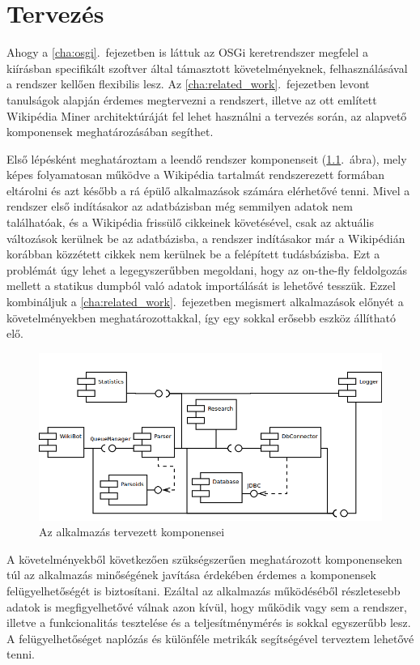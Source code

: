 \chapter{Tervezés}
\label{cha:design}

Ahogy a \ref{cha:osgi}.~fejezetben is láttuk az OSGi keretrendszer megfelel a kiírásban specifikált szoftver által támasztott követelményeknek, felhasználásával a rendszer kellően flexibilis lesz. Az \ref{cha:related_work}.~fejezetben levont tanulságok alapján érdemes megtervezni a rendszert, illetve az ott említett Wikipédia Miner architektúráját fel lehet használni a tervezés során, az alapvető komponensek meghatározásában segíthet.

Első lépésként meghatároztam a leendő rendszer komponenseit (\ref{fig:componentdiagram}.~ábra), mely képes folyamatosan működve a Wikipédia tartalmát rendszerezett formában eltárolni és azt később a rá épülő alkalmazások számára elérhetővé tenni. Mivel a rendszer első indításakor az adatbázisban még semmilyen adatok nem találhatóak, és a Wikipédia frissülő cikkeinek követésével, csak az aktuális változások kerülnek be az adatbázisba, a rendszer indításakor már a Wikipédián korábban közzétett cikkek nem kerülnek be a felépített tudásbázisba. Ezt a problémát úgy lehet a legegyszerűbben megoldani, hogy az on-the-fly feldolgozás mellett a statikus dumpból való adatok importálását is lehetővé tesszük. Ezzel kombináljuk a \ref{cha:related_work}.~fejezetben megismert alkalmazások előnyét a követelményekben meghatározottakkal, így egy sokkal erősebb eszköz állítható elő.

\begin{figure}[htp]
\centering
\includegraphics[scale=0.5]{img/componentdiagram}
\caption{Az alkalmazás tervezett komponensei}
\label{fig:componentdiagram}
\end{figure}

A követelményekből következően szükségszerűen meghatározott komponenseken túl az alkalmazás minőségének javítása érdekében érdemes a komponensek felügyelhetőségét is biztosítani. Ezáltal az alkalmazás működéséből részletesebb adatok is megfigyelhetővé válnak azon kívül, hogy működik vagy sem a rendszer, illetve a funkcionalitás tesztelése és a teljesítménymérés is sokkal egyszerűbb lesz. A felügyelhetőséget naplózás és különféle metrikák segítségével terveztem lehetővé tenni.

